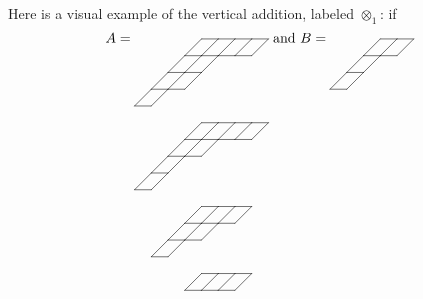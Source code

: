 \documentclass{tac}
\begin{document}
{\begin{enumerate}
Here is a visual example of the vertical addition, labeled $\otimes_1$: if
$$
A=\xymatrix @W=1.0pc @H=1.0pc @R=1.0pc @C=1.0pc
 {*=0{}&*=0{}&*=0{}&*=0{}&*=0{}\ar@{-}[r]\ar@{-}[dl]&*=0{}\ar@{-}[r]\ar@{-}[dl]&*=0{}\ar@{-}[r]\ar@{-}[dl]&*=0{}\ar@{-}[r]\ar@{-}[dl]&*=0{}\ar@{-}[dl]
\\*=0{}&*=0{}&*=0{}&*=0{}\ar@{-}[r]\ar@{-}[dl]&*=0{}\ar@{-}[r]\ar@{-}[dl]&*=0{}\ar@{-}[r]\ar@{-}[dl]&*=0{}\ar@{-}[r]&*=0{}
\\*=0{}&*=0{}&*=0{}\ar@{-}[r]\ar@{-}[dl]&*=0{}\ar@{-}[r]\ar@{-}[dl]&*=0{}\ar@{-}[dl]
\\*=0{}&*=0{}\ar@{-}[r]\ar@{-}[dl]&*=0{}\ar@{-}[r]\ar@{-}[dl]&*=0{}
\\*=0{}\ar@{-}[r]&*=0{}
\\
*=0{}&*=0{}&*=0{}&*=0{}&*=0{}\ar@{-}[r]\ar@{-}[dl]&*=0{}\ar@{-}[r]\ar@{-}[dl]&*=0{}\ar@{-}[r]\ar@{-}[dl]&*=0{}\ar@{-}[r]\ar@{-}[dl]&*=0{}\ar@{-}[dl]
\\*=0{}&*=0{}&*=0{}&*=0{}\ar@{-}[r]\ar@{-}[dl]&*=0{}\ar@{-}[r]\ar@{-}[dl]&*=0{}\ar@{-}[r]\ar@{-}[dl]&*=0{}\ar@{-}[r]&*=0{}
\\*=0{}&*=0{}&*=0{}\ar@{-}[r]\ar@{-}[dl]&*=0{}\ar@{-}[r]\ar@{-}[dl]&*=0{}
\\*=0{}&*=0{}\ar@{-}[r]\ar@{-}[dl]&*=0{}\ar@{-}[dl]
\\*=0{}\ar@{-}[r]&*=0{}
\\
*=0{}&*=0{}&*=0{}&*=0{}&*=0{}\ar@{-}[r]\ar@{-}[dl]&*=0{}\ar@{-}[r]\ar@{-}[dl]&*=0{}\ar@{-}[r]\ar@{-}[dl]&*=0{}\ar@{-}[dl]
\\*=0{}&*=0{}&*=0{}&*=0{}\ar@{-}[r]\ar@{-}[dl]&*=0{}\ar@{-}[r]\ar@{-}[dl]&*=0{}\ar@{-}[r]\ar@{-}[dl]&*=0{}
\\*=0{}&*=0{}&*=0{}\ar@{-}[r]\ar@{-}[dl]&*=0{}\ar@{-}[r]\ar@{-}[dl]&*=0{}
\\*=0{}&*=0{}\ar@{-}[r]&*=0{}
\\
*=0{}&*=0{}&*=0{}&*=0{}&*=0{}\ar@{-}[r]\ar@{-}[dl]&*=0{}\ar@{-}[r]\ar@{-}[dl]&*=0{}\ar@{-}[r]\ar@{-}[dl]&*=0{}\ar@{-}[dl]&*=0{}
\\*=0{}&*=0{}&*=0{}&*=0{}\ar@{-}[r]&*=0{}\ar@{-}[r]&*=0{}\ar@{-}[r]&*=0{}
\\*=0{}}
\text{ and }B=\xymatrix @W=1.0pc @H=1.0pc @R=1.0pc @C=1.0pc
 {*=0{}&*=0{}&*=0{}&*=0{}\ar@{-}[r]\ar@{-}[dl]&*=0{}\ar@{-}[r]\ar@{-}[dl]&*=0{}\ar@{-}[dl]
\\*=0{}&*=0{}&*=0{}\ar@{-}[r]\ar@{-}[dl]&*=0{}\ar@{-}[r]\ar@{-}[dl]&*=0{}
\\*=0{}&*=0{}\ar@{-}[r]\ar@{-}[dl]&*=0{}\ar@{-}[dl]
\\*=0{}\ar@{-}[r]&*=0{}
}$$
\end{enumerate}}
\end{document}
